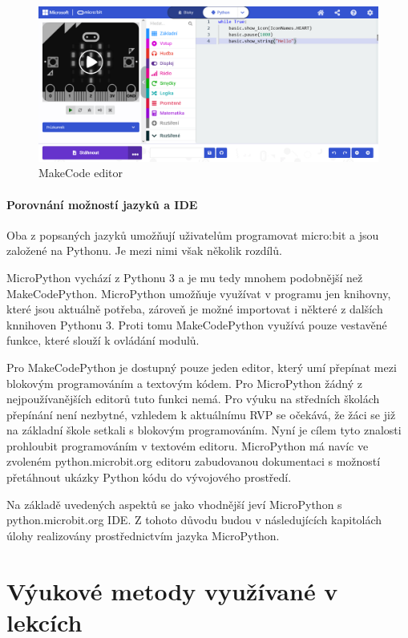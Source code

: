 \documentclass[
  digital,     %
  oneside,     %
  nosansbold,  %
  colorbold, %
  lof,         %
  nolot,         %
]{fithesis4}
\begin{document}
\begin{figure}
    \centering
    \includegraphics[width=\textwidth]  {images/makecodeE.png}
    \caption{MakeCode editor}
\end{figure}

\subsubsection{Porovnání možností jazyků a IDE} 
Oba z popsaných jazyků umožňují uživatelům programovat micro:bit a jsou založené na Pythonu. Je mezi nimi však několik rozdílů.

MicroPython vychází z Pythonu 3 a je mu tedy mnohem podobnější než MakeCodePython. MicroPython umožňuje využívat v programu jen knihovny, které jsou aktuálně potřeba, zároveň je možné importovat i některé z dalších knnihoven Pythonu 3. Proti tomu MakeCodePython využívá pouze vestavěné funkce, které slouží k ovládání modulů.

Pro MakeCodePython je dostupný pouze jeden editor, který umí přepínat mezi blokovým programováním a textovým kódem. Pro MicroPython žádný z nejpoužívanějších editorů tuto funkci nemá. Pro výuku na středních školách  přepínání není nezbytné, vzhledem k aktuálnímu RVP se očekává, že žáci se již na základní škole setkali s blokovým programováním. Nyní je cílem tyto znalosti prohloubit programováním v textovém editoru.  MicroPython má navíc ve zvoleném python.microbit.org editoru zabudovanou dokumentaci s možností přetáhnout ukázky Python kódu do vývojového prostředí.

Na základě uvedených aspektů se jako vhodnější jeví MicroPython s python.microbit.org IDE. Z tohoto důvodu budou v následujících kapitolách úlohy realizovány prostřednictvím jazyka MicroPython. 


\chapter{Výukové metody využívané v lekcích}
\end{document}
